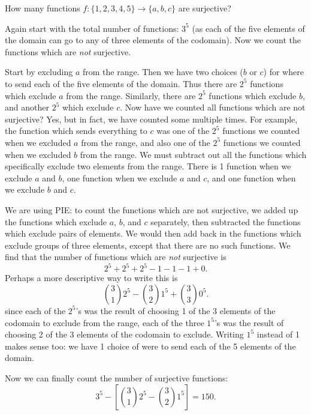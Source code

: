 \documentclass[12pt]{article}
\begin{document}
\begin{example}
  How many functions $f: \{1,2,3,4,5\} \to \{a,b,c\}$ are surjective?
  \begin{solution}
   Again start with the total number of functions: $3^5$ (as each of the five elements of the domain can go to any of three elements of the codomain).  Now we count the functions which are {\em not} surjective.
   
   Start by excluding $a$ from the range.  Then we have two choices ($b$ or $c$) for where to send each of the five elements of the domain.  Thus there are $2^5$ functions which exclude $a$ from the range.  Similarly, there are $2^5$ functions which exclude $b$, and another $2^5$ which exclude $c$.  Now have we counted all functions which are not surjective?  Yes, but in fact, we have counted some multiple times.  For example, the function which sends everything to $c$ was one of the $2^5$ functions we counted when we excluded $a$ from the range, and also one of the $2^5$ functions we counted when we excluded $b$ from the range.  We must subtract out all the functions which specifically exclude two elements from the range.  There is 1 function when we exclude $a$ and $b$, one function when we exclude $a$ and $c$, and one function when we exclude $b$ and $c$.  
   
   We are using PIE: to count the functions which are not surjective, we added up the functions which exclude $a$, $b$, and $c$ separately, then subtracted the functions which exclude pairs of elements.  We would then add back in the functions which exclude groups of three elements, except that there are no such functions.  We find that the number of functions which are {\em not} surjective is
   \[2^5 + 2^5 + 2^5 - 1 - 1 - 1 + 0.\]
   Perhaps a more descriptive way to write this is
   \[{3 \choose 1}2^5 - {3 \choose 2}1^5 + {3 \choose 3}0^5.\]
   since each of the $2^5$'s was the result of choosing 1 of the 3 elements of the codomain to exclude from the range, each of the three $1^5$'s was the result of choosing 2 of the 3 elements of the codomain to exclude.  Writing $1^5$ instead of 1 makes sense too: we have 1 choice of were to send each of the 5 elements of the domain.
   
   Now we can finally count the number of surjective functions:
   \[3^5 - \left[{3 \choose 1}2^5 - {3 \choose 2}1^5\right] = 150.\]
  \end{solution}

\end{example}
\end{document}
